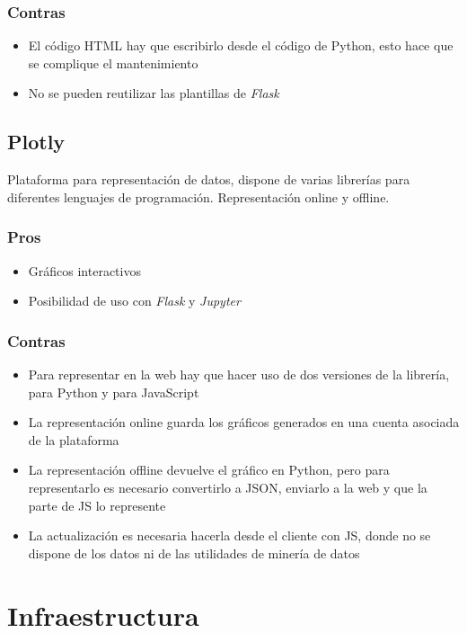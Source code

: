 \subsubsection{Contras}
\begin{itemize}
	\item El código HTML hay que escribirlo desde el código de Python, esto hace
	que se complique el mantenimiento
	\item No se pueden reutilizar las plantillas de \textit{Flask}
\end{itemize}

\subsection{Plotly}
Plataforma para representación de datos, dispone de varias librerías para
diferentes lenguajes de programación. Representación online y offline.
\subsubsection{Pros}
\begin{itemize}
	\item Gráficos interactivos
	\item Posibilidad de uso con \textit{Flask} y \textit{Jupyter}
\end{itemize}
\subsubsection{Contras}
\begin{itemize}
	\item Para representar en la web hay que hacer uso de dos versiones de la
	librería, para Python y para JavaScript
	\item La representación online guarda los gráficos generados en una cuenta
	asociada de la plataforma
	\item La representación offline devuelve el gráfico en Python, pero para
	representarlo es necesario convertirlo a JSON, enviarlo a la web y que la parte
	de JS lo represente
	\item La actualización es necesaria hacerla desde el cliente con JS, donde no
	se dispone de los datos ni de las utilidades de minería de datos
\end{itemize}

\section{Infraestructura}
